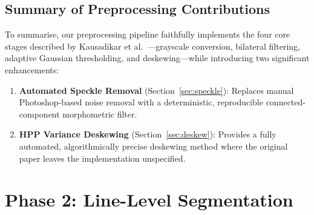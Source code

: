 \documentclass[12pt, a4paper]{article}
\begin{document}
\vspace{0.3em}
\noindent{}


\subsection{Summary of Preprocessing Contributions}

To summarise, our preprocessing pipeline faithfully implements the four core stages described by Kausadikar et al.~\cite{kausadikar2025}---grayscale conversion, bilateral filtering, adaptive Gaussian thresholding, and deskewing---while introducing two significant enhancements:

\begin{enumerate}
    \item \textbf{Automated Speckle Removal} (Section~\ref{sec:speckle}): Replaces manual Photoshop-based noise removal with a deterministic, reproducible connected-component morphometric filter.
    \item \textbf{HPP Variance Deskewing} (Section~\ref{sec:deskew}): Provides a fully automated, algorithmically precise deskewing method where the original paper leaves the implementation unspecified.
\end{enumerate}


\section{Phase 2: Line-Level Segmentation}
\end{document}
